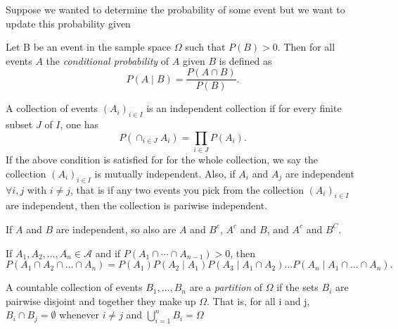\documentclass[../main.tex]{subfiles}
\begin{document}
\begin{remark}
Suppose we wanted to determine the probability of some event but we want to update this probability
given 
\end{remark}

\begin{definition} \label{def: conditional_prob}
    

Let B be an event in the sample space \(\Omega\) such that \(P(B) > 0\). Then for all events \(A\) the \textit{conditional probability} of \(A\) given \(B\) is defined as
\[
P(A \mid B) = \frac{P(A \cap B)}{P(B)}.
\]

\end{definition}

\begin{definition}\label{def: independence}
A collection of events $(A_i)_{i \in I}$ is an independent collection if for every finite subset $J$ of $I$, one has 
\[
P(\cap_{i \in J}{A_i}) = \prod_{i \in J}{P(A_i)}.
\]
If the above condition is satisfied for for the whole collection, we say the collection $(A_i)_{i \in I}$ is mutually independent. Also, 
if $A_i$ and $A_j$ are independent $\forall i,j$ with $i \neq j$, that is if any two events you pick from the collection $(A_i)_{i \in I}$ are independent, then the collection is pariwise independent.

\end{definition}



\begin{exercise}
If $A$ and $B$ are independent, so also are $A$ and $B^c$, $A^c$ and $B$, and $A^c$ and $B^C$. 
\end{exercise}

\begin{proposition}
If \(A_1, A_2, \dots, A_n \in \mathcal{A}\) and if $ P(A_1 \cap \cdots \cap A_{n-1}) > 0$, then  
\[
P(A_1 \cap A_2 \cap \dots \cap A_n) = P(A_1)P(A_2 \mid A_1)P(A_3 \mid A_1 \cap A_2) \dots P(A_n \mid A_1 \cap \dots \cap A_n).
\]
\end{proposition}


\begin{definition}
A countable collection of events \(B_1, \dots, B_n\) are a \textit{partition} of \(\Omega\) 
if the sets \(B_i\) are pairwise disjoint and together they make up \(\Omega\). 
That is, for all i and j, \( B_i \cap B_j = \emptyset \) whenever \(i \neq j\) 
and \( \bigcup_{i=1}^n B_i = \Omega\)
\end{definition}
\end{document}
